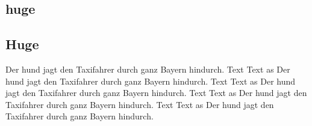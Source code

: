 \documentclass[10pt, a4paper, draft]{article}
\begin{document}
{\LARGE \blindtext\par}

\subsection{huge}

{\huge \blindtext\par}

\subsection{Huge}

{\Huge \blindtext\par}

{\Huge
Der hund jagt den Taxifahrer durch ganz Bayern hindurch. {\normalsize Text Text} as Der hund jagt den Taxifahrer durch ganz Bayern hindurch. Text Text as Der hund jagt den Taxifahrer durch ganz Bayern hindurch. Text Text as Der hund jagt den Taxifahrer durch ganz Bayern hindurch. Text Text as Der hund jagt den Taxifahrer durch ganz Bayern hindurch. }
\end{document}
